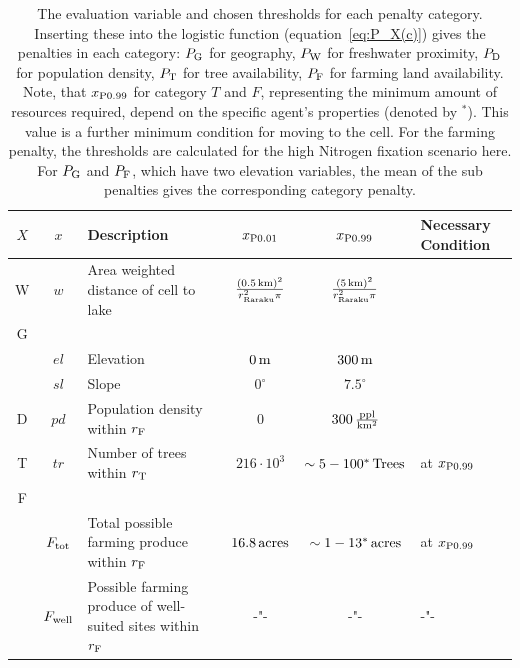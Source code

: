  \begin{table}
	\centering
	\begin{tabular}{c|c|K|c|c|L}
		$X$ & $x$& Description & $x_{\rm P0.01}$ & $x_{\rm P0.99}$ & Necessary Condition \\ \hline
		W &$w$ & Area weighted distance of cell to lake & $\frac{(0.5\, {\rm km})^2}{r_\text{Raraku}^2\pi}$ & $\frac{(5\, {\rm km})^2}{r_\text{Raraku}^2\pi}$\\
		G & & & & & \\
		& $el$ & Elevation & $0\, {\rm m}$ & $300\, {\rm m}$ & \\
		& $sl$ & Slope & $0^\circ$ & $7.5^\circ$ & \\
		D & $pd$ & Population density within $r_{\rm F}$ & 0 & $300\, {\rm \frac{ppl}{km^2}}$ & \\
		T & $tr$ & Number of trees within $r_{\rm T}$ & $216\cdot 10^3$ & $\sim 5-100^* \, {\rm Trees}$ &  at $x_{\rm P0.99}$\\
		F & & & & & \\
		& $F_{\rm tot}$ & Total possible farming produce within $r_{\rm F}$ & $16.8 \, \rm{acres}$  & $\sim 1-13^* \, \rm{acres}$& at $x_{\rm P0.99}$\\
		& $F_{\rm well}$ & Possible farming produce of well-suited sites within $r_{\rm F}$ & -"- & -"- & -"-\\
	\end{tabular}
\caption{The evaluation variable and chosen thresholds for each penalty category.
	Inserting these into the logistic function (equation~\ref{eq:P_X(c)}) gives the penalties in each category:
	$P_{\rm G}$ for geography, $P_{\rm W}$ for freshwater proximity, $P_{\rm D}$ for population density, $P_{\rm T}$ for tree availability, $P_{\rm F}$ for farming land availability.
	Note, that $x_{\rm P0.99}$ for category $T$ and $F$, representing the minimum amount of resources required, depend on the specific agent's properties (denoted by $^*$).
	This value is a further minimum condition for moving to the cell. For the farming penalty, the thresholds are calculated for the high Nitrogen fixation scenario here.
	For $P_{\rm G}$ and $P_{\rm F}$, which have two elevation variables, the mean of the sub penalties gives the corresponding category penalty.
}
\label{tab:x01x09} 
\end{table}


